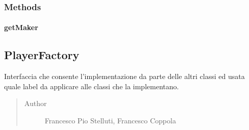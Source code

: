 \documentclass[letterpaper,10pt,italian]{sphinxmanual}
\begin{document}
\subsubsection{Methods}
\label{\detokenize{source/it/unicam/cs/pa/mastermind/factories/MakerFactory:methods}}

\paragraph{getMaker}
\label{\detokenize{source/it/unicam/cs/pa/mastermind/factories/MakerFactory:getmaker}}

\begin{fulllineitems}
\label{\detokenize{source/it/unicam/cs/pa/mastermind/factories/MakerFactory:it.unicam.cs.pa.mastermind.factories.MakerFactory.getMaker()}}
\end{fulllineitems}



\subsection{PlayerFactory}
\label{\detokenize{source/it/unicam/cs/pa/mastermind/factories/PlayerFactory:playerfactory}}\label{\detokenize{source/it/unicam/cs/pa/mastermind/factories/PlayerFactory::doc}}

\begin{fulllineitems}
\label{\detokenize{source/it/unicam/cs/pa/mastermind/factories/PlayerFactory:it.unicam.cs.pa.mastermind.factories.PlayerFactory}}
Interfaccia  che consente l’implementazione da parte delle altri classi ed usata quale label da applicare alle classi che la implementano.
\begin{quote}\begin{description}
\item[{Author}] \leavevmode
Francesco Pio Stelluti, Francesco Coppola

\end{description}\end{quote}

\end{fulllineitems}
\end{document}
